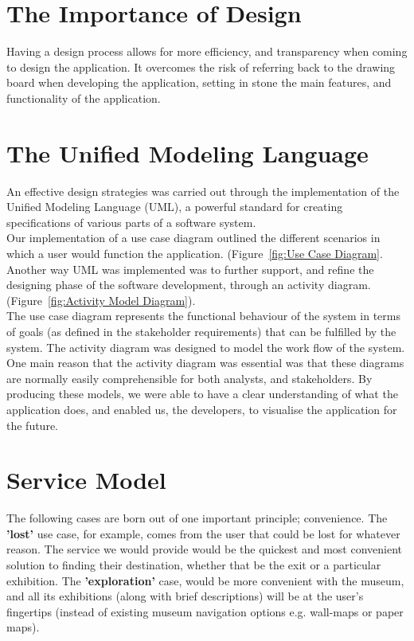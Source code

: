 
\section{The Importance of Design}
Having a design process allows for more efficiency, and transparency when coming to design the application. It overcomes the risk of referring back to the drawing board when developing the application, setting in stone the main features, and functionality of the application.

\section{The Unified Modeling Language}
An effective design strategies was carried out through the implementation of the Unified Modeling Language (UML), a powerful standard for creating specifications of various parts of a software system.\\

Our implementation of a use case diagram outlined the different scenarios in which a user would function the application. (Figure~\ref{fig:Use Case Diagram}. Another way UML was implemented was to further support, and refine the designing phase of the software development, through an activity diagram. (Figure~\ref{fig:Activity Model Diagram}).\\

The use case diagram represents the functional behaviour of the system in terms of goals (as defined in the stakeholder requirements) that can be fulfilled by the system. The activity diagram was designed to model the work flow of the system. One main reason that the activity diagram was essential was that these diagrams are normally easily comprehensible for both analysts, and stakeholders. By producing these models, we were able to have a clear understanding of what the application does, and enabled us, the developers, to visualise the application for the future.

\section{Service Model}
The following cases are born out of one important principle; convenience. The \textbf{'lost'} use case, for example, comes from the user that could be lost for whatever reason. The service we would provide would be the quickest and most convenient solution to finding their destination, whether that be the exit or a particular exhibition. The \textbf{'exploration'} case, would be more convenient with the museum, and all its exhibitions (along with brief descriptions) will be at the user's fingertips (instead of existing museum navigation options e.g. wall-maps or paper maps).


